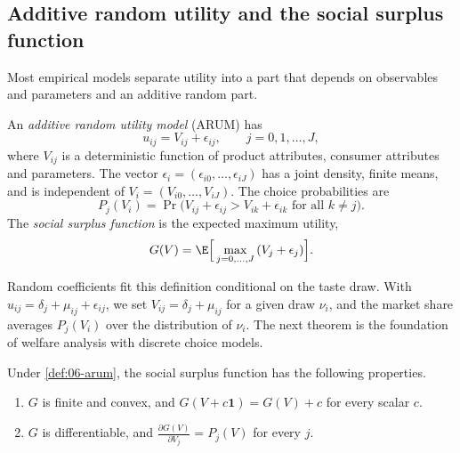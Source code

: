 \subsection{Additive random utility and the social surplus function}\label{sec:06-arum}

Most empirical models separate utility into a part that depends on observables and parameters and an additive
random part.

\begin{definition}\label{def:06-arum}
An \emph{additive random utility model} (ARUM) has
\begin{equation}\label{eq:06-arum}
u_{ij} = V_{ij} + \epsilon_{ij}, \qquad j = 0, 1, \dots, J,
\end{equation}
where $V_{ij}$ is a deterministic function of product attributes, consumer attributes and parameters. The
vector $\epsilon_i = (\epsilon_{i0}, \dots, \epsilon_{iJ})$ has a joint density, finite means, and is independent
of $V_i = (V_{i0}, \dots, V_{iJ})$. The choice probabilities are
\begin{equation*}
P_j(V_i) = \Pr\big(V_{ij} + \epsilon_{ij} > V_{ik} + \epsilon_{ik} \text{ for all } k \neq j\big).
\end{equation*}
The \emph{social surplus function} is the expected maximum utility,
\begin{equation}\label{eq:06-G}
G(V) = \E\Big[\max_{j = 0, \dots, J}\,(V_j + \epsilon_j)\Big].
\end{equation}
\end{definition}

Random coefficients fit this definition conditional on the taste draw. With
$u_{ij} = \delta_j + \mu_{ij} + \epsilon_{ij}$, we set $V_{ij} = \delta_j + \mu_{ij}$ for a given draw $\nu_i$,
and the market share averages $P_j(V_i)$ over the distribution of $\nu_i$. The next theorem is the
foundation of welfare analysis with discrete choice models.

\begin{theorem}\label{thm:06-wdz}
Under \cref{def:06-arum}, the social surplus function has the following properties.
\begin{enumerate}[label=(\roman*)]
  \item $G$ is finite and convex, and $G(V + c\mathbf{1}) = G(V) + c$ for every scalar $c$.
  \item $G$ is differentiable, and $\frac{\partial G(V)}{\partial V_j} = P_j(V)$ for every $j$.
\end{enumerate}
\end{theorem}

